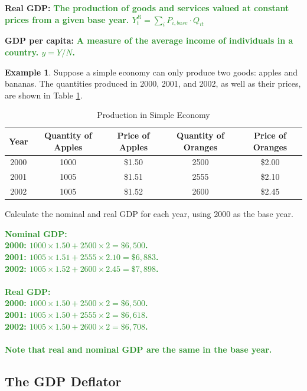 \documentclass[11pt]{article}\usepackage[]{graphicx}\usepackage[]{color}
\theoremstyle{definition}
\newtheorem{exmp}{Example}[section]
\newcommand{\blank}[1]{}
\newcommand{\ddp}[1]{{\textbf{\textcolor{ForestGreen}{#1}}}}
\newcommand{\defn}[1]{\textbf{#1}}
\begin{document}
\defn{Real GDP:} \ddp{The production of goods and services valued at constant prices from a given base year. $Y_t^R = \sum_i P_{i,base} \cdot Q_{it}$\\}


\defn{GDP per capita:} \ddp{A measure of the average income of individuals in a country. $y = Y/N$.}

\begin{exmp}
	
  Suppose a simple economy can only produce two goods: apples and bananas. The quantities produced in 2000, 2001, and 2002, as well as their prices, are shown in Table \ref{simp}.

\begin{table}[h!]
	\centering
	\caption{Production in Simple Economy}
	\label{simp}
	\begin{tabular}{c|c|c|c|c}       
		
		Year & Quantity of Apples & Price of Apples & Quantity of Oranges & Price of Oranges  \\
		\hline
		2000 & 1000 & \$1.50 & 2500 & \$2.00 \\
		2001 & 1005 & \$1.51 & 2555 & \$2.10 \\
		2002 & 1005 & \$1.52 & 2600 & \$2.45 \\
	\end{tabular}
\end{table} 

Calculate the nominal and real GDP for each year, using 2000 as the base year.
\end{exmp}
\ddp{Nominal GDP: \\
	2000: $1000 \times 1.50 + 2500 \times 2 = \$6,500$. \\
	2001: $1005 \times 1.51 + 2555 \times 2.10 = \$6,883$. \\
	2002: $1005 \times 1.52 + 2600 \times 2.45 = \$7,898$. \\ \\
	Real GDP: \\
	2000: $1000 \times 1.50 + 2500 \times 2 = \$6,500$. \\
	2001: $1005 \times 1.50 + 2555 \times 2 = \$6,618$. \\
	2002: $1005 \times 1.50 + 2600 \times 2 = \$6,708$. \\ \\
	Note that real and nominal GDP are the same in the base year.}
\blank{}
\blank{}
\blank{}
\blank{}

\subsection{The GDP Deflator}
\end{document}
